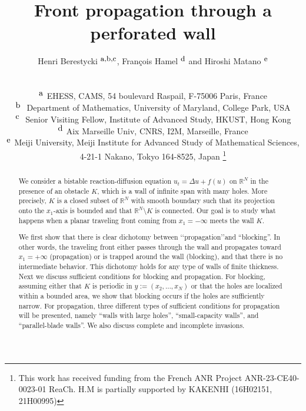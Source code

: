 \documentclass[a4paper,12pt,fullpage]{article}
\numberwithin{equation}{section}
\def\R{{\mathbb R}}
\begin{document}
\title{\bf{Front propagation through a perforated wall}}
\author{Henri Berestycki$^{\hbox{\small{ a,b,c}}}$, 
Fran\c cois Hamel$^{\hbox{\small{ d}}}$ and 
Hiroshi Matano$^{\hbox{\small{ e}}}$\\
\date{}\\
\footnotesize{$^{\hbox{a }}$EHESS, CAMS, 54 boulevard Raspail, F-75006 Paris, France}\\
\footnotesize{$^{\hbox{b }}$ Department of Mathematics, University of Maryland, College Park, USA}\\
\footnotesize{$^{\hbox{c }}$ Senior Visiting Fellow, Institute of Advanced Study, HKUST, Hong Kong}\\
\footnotesize{$^{\hbox{d }}$Aix Marseille Univ, CNRS, I2M, Marseille, France}\\
\footnotesize{$^{\hbox{e }}$Meiji University, Meiji Institute for Advanced Study of Mathematical Sciences,}\\
\footnotesize{4-21-1 Nakano, Tokyo 164-8525, Japan}
\thanks{This work has received funding from the French ANR Project ANR-23-CE40-0023-01 ReaCh.  H.M is partially supported by KAKENHI (16H02151, 21H00995) }}
\maketitle

\begin{abstract}
We consider a bistable reaction-diffusion equation $u_t=\Delta u +f(u)$ on $\R^N$ in the presence of an obstacle $K$, which is a wall of infinite span with many holes. More precisely, $K$ is a closed subset of $\R^N$ with smooth boundary such that its projection onto the $x_1$-axis is bounded and that $\R^N \setminus K$ is connected. Our goal is to study what happens when a planar traveling front coming from $x_1 = -\infty$ meets the wall $K$.

We first show that there is clear dichotomy between \lq\lq propagation\rq\rq and ``blocking''.  In other words, the traveling front either passes through the wall and propagates toward $x_1=+\infty$ (propagation) or is trapped around the wall (blocking), and that there is no intermediate behavior. This dichotomy holds for any type of walls of finite thickness. Next we discuss sufficient conditions for blocking and propagation. For blocking, assuming either that $K$ is periodic in $y:=(x_2,\ldots, x_N)$ or that the holes are localized within a bounded area, we show that blocking occurs if the holes are sufficiently narrow. For propagation, three different types of sufficient conditions for propagation will be presented, namely ``walls with large holes'', ``small-capacity walls'', and ``parallel-blade walls''. We also discuss complete and incomplete invasions.
\end{abstract}
\end{document}
